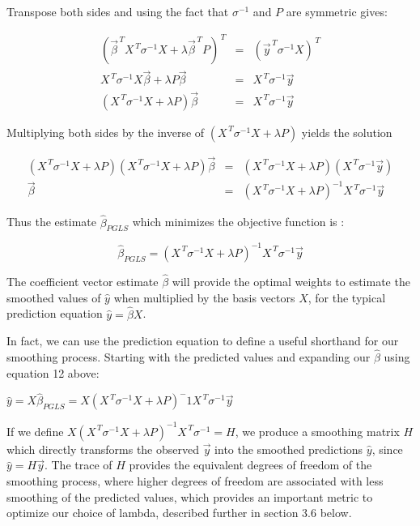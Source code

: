 \documentclass[12pt]{article}
\begin{document}
Transpose both sides and using the fact that $\sigma^{-1}$ and $P$ are symmetric gives:

\begin{eqnarray*}
(\vec{\beta}^{\, T}X^{\, T}\sigma^{-1}X+\lambda\vec{\beta}^{\, T}P)^{\, T}&=&(\vec{y}^{\, T}\sigma^{-1}X)^{\, T}\\[10px]
X^{\, T}\sigma^{-1}X\vec{\beta}+\lambda P\vec{\beta}&=&X^{\, T}\sigma^{-1}\vec{y}\\[10px]
(X^{\, T}\sigma^{-1}X+\lambda P)\vec{\beta}&=&X^{\, T}\sigma^{-1}\vec{y}
\end{eqnarray*}

Multiplying both sides by the inverse of $(X^{\, T}\sigma^{-1}X+\lambda P)$ yields the solution

\begin{eqnarray*}
(X^{\, T}\sigma^{-1}X+\lambda P)(X^{\, T}\sigma^{-1}X+\lambda P)\vec{\beta}&=&(X^{\, T}\sigma^{-1}X+\lambda P)(X^{\, T}\sigma^{-1}\vec{y})\\[10px]
\vec{\beta}&=&(X^{\, T}\sigma^{-1}X+\lambda P)^{-1}X^{\, T}\sigma^{-1}\vec{y}
\end{eqnarray*}

Thus the estimate $\hat{\beta}_{PGLS}$  which  minimizes the objective function is :

\begin{equation}
\hat{\beta}_{PGLS}=(X^{\, T}\sigma^{-1}X+\lambda P)^{-1}X^{\, T}\sigma^{-1}\vec{y}\label{eq22}
\end{equation}

The coefficient vector estimate $\hat{\beta}$ will provide the optimal weights to estimate the smoothed values of $\hat{y}$ when multiplied by the basis vectors $X$, for the typical prediction equation $\hat{y}=\hat{\beta}X$.

In fact, we can use the prediction equation to define a useful shorthand for our smoothing process. Starting with the predicted values and expanding our $\hat{\beta}$ using equation 12 above:

\begin{center}
$\hat{y}=X\hat{\beta}_{PGLS}=X(X^{\, T}\sigma^{-1}X+\lambda P)^-1X^{\, T}\sigma^{-1}\vec{y}$
\end{center}

If we define $X(X^{\, T}\sigma^{-1}X+\lambda P)^{-1}X^{\, T}\sigma^{-1}=H$, we produce a smoothing matrix $H$ which directly transforms the observed $\vec{y}$ into the smoothed predictions $\hat{y}$, since $\hat{y}=H\vec{y}$. The trace of $H$ provides the equivalent degrees of freedom of the smoothing process, where higher degrees of freedom are associated with less smoothing of the predicted values, which provides an important metric to optimize our choice of lambda, described further in section 3.6 below.
\end{document}

